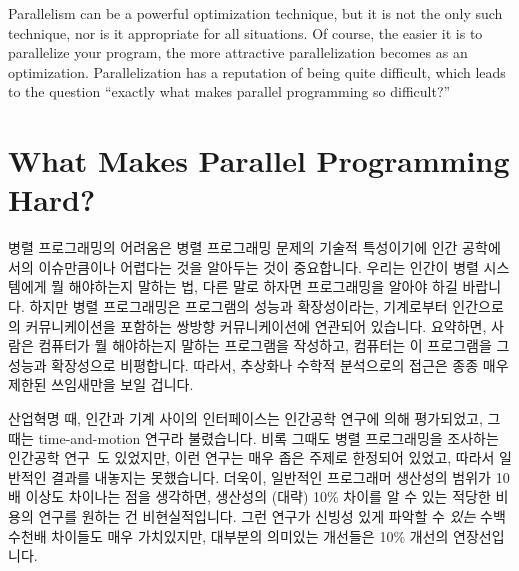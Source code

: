 Parallelism can be a powerful optimization technique, but
it is not the only such technique, nor is it appropriate for all
situations.
Of course, the easier it is to parallelize your program, the
more attractive parallelization becomes as an optimization.
Parallelization has a reputation of being quite difficult,
which leads to the question ``exactly what makes parallel
programming so difficult?''
\fi

\section{What Makes Parallel Programming Hard?}
\label{sec:intro:What Makes Parallel Programming Hard?}


병렬 프로그래밍의 어려움은 병렬 프로그래밍 문제의 기술적 특성이기에 인간
공학에서의 이슈만큼이나 어렵다는 것을 알아두는 것이 중요합니다.
우리는 인간이 병렬 시스템에게 뭘 해야하는지 말하는 법, 다른 말로 하자면
프로그래밍을 알아야 하길 바랍니다.
하지만 병렬 프로그래밍은 프로그램의 성능과 확장성이라는, 기계로부터 인간으로의
커뮤니케이션을 포함하는 쌍방향 커뮤니케이션에 연관되어 있습니다.
요약하면, 사람은 컴퓨터가 뭘 해야하는지 말하는 프로그램을 작성하고, 컴퓨터는 이
프로그램을 그 성능과 확장성으로 비평합니다.
따라서, 추상화나 수학적 분석으로의 접근은 종종 매우 제한된 쓰임새만을 보일
겁니다.

산업혁명 때, 인간과 기계 사이의 인터페이스는 인간공학 연구에 의해 평가되었고,
그때는 time-and-motion 연구라 불렸습니다.
비록 그때도 병렬 프로그래밍을 조사하는 인간공학
연구~\cite{RyanEccles2005HPCSNovice,RyanEccles2006HPCSNoviceNeeds,
LorinHochstein2005SC,DuaneSzafron1994PEMPDS}도
있었지만, 이런 연구는 매우 좁은 주제로 한정되어 있었고, 따라서 일반적인 결과를
내놓지는 못했습니다.
더욱이, 일반적인 프로그래머 생산성의 범위가 10배 이상도 차이나는 점을 생각하면,
생산성의 (대략) 10\% 차이를 알 수 있는 적당한 비용의 연구를 원하는 건
비현실적입니다.
그런 연구가 신빙성 있게 파악할 수 \emph{있는} 수백 수천배 차이들도 매우
가치있지만, 대부분의 의미있는 개선들은 10\% 개선의 연장선입니다.


